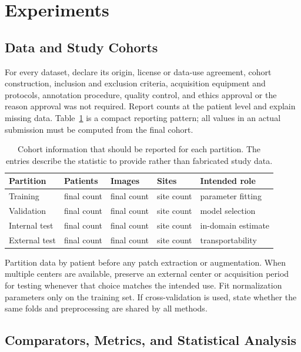\section{Experiments}
\label{sec:experiments}

\subsection{Data and Study Cohorts}

For every dataset, declare its origin, license or data-use agreement, cohort
construction, inclusion and exclusion criteria, acquisition equipment and
protocols, annotation procedure, quality control, and ethics approval or the
reason approval was not required.  Report counts at the patient level and
explain missing data.  Table~\ref{tab:cohort} is a compact reporting pattern;
all values in an actual submission must be computed from the final cohort.

\begin{table}
  \caption{Cohort information that should be reported for each partition.  The
  entries describe the statistic to provide rather than fabricated study data.}
  \label{tab:cohort}
  \centering
  \begin{tabular}{@{}lllll@{}}
    \toprule
    Partition & Patients & Images & Sites & Intended role \\
    \midrule
    Training   & final count & final count & site count & parameter fitting \\
    Validation & final count & final count & site count & model selection \\
    Internal test & final count & final count & site count & in-domain estimate \\
    External test & final count & final count & site count & transportability \\
    \bottomrule
  \end{tabular}
\end{table}

Partition data by patient before any patch extraction or augmentation.  When
multiple centers are available, preserve an external center or acquisition
period for testing whenever that choice matches the intended use.  Fit
normalization parameters only on the training set.  If cross-validation is
used, state whether the same folds and preprocessing are shared by all methods.

\subsection{Comparators, Metrics, and Statistical Analysis}

